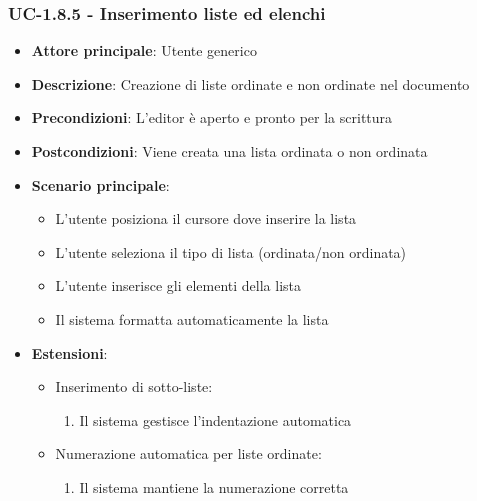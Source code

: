 \documentclass[11pt,a4paper]{article}
\begin{document}
\subsubsection{UC-1.8.5 - Inserimento liste ed elenchi}
\begin{itemize}
    \item \textbf{Attore principale}: Utente generico
    \item \textbf{Descrizione}: Creazione di liste ordinate e non ordinate nel documento
    \item \textbf{Precondizioni}: L'editor è aperto e pronto per la scrittura
    \item \textbf{Postcondizioni}: Viene creata una lista ordinata o non ordinata
    \item \textbf{Scenario principale}:
        \begin{itemize}
            \item L'utente posiziona il cursore dove inserire la lista
            \item L'utente seleziona il tipo di lista (ordinata/non ordinata)
            \item L'utente inserisce gli elementi della lista
            \item Il sistema formatta automaticamente la lista
        \end{itemize}
    \item \textbf{Estensioni}:
        \begin{itemize}
            \item Inserimento di sotto-liste:
                \begin{enumerate}
                    \item Il sistema gestisce l'indentazione automatica
                \end{enumerate}
            \item Numerazione automatica per liste ordinate:
                \begin{enumerate}
                    \item Il sistema mantiene la numerazione corretta
                \end{enumerate}
        \end{itemize}
\end{itemize}
\end{document}
